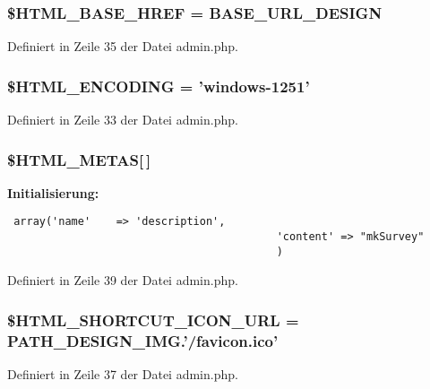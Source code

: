 \subsubsection{\setlength{\rightskip}{0pt plus 5cm}\$HTML\_\-BASE\_\-HREF = {\bf BASE\_\-URL\_\-DESIGN}}\label{admin_8php_bdd3b27cd848a5c3c8bc46b030a87eb3}




Definiert in Zeile 35 der Datei admin.php.
\subsubsection{\setlength{\rightskip}{0pt plus 5cm}\$HTML\_\-ENCODING = 'windows-1251'}\label{admin_8php_d7fdb84ca914d8fc89cc328e4c09c70c}




Definiert in Zeile 33 der Datei admin.php.
\subsubsection{\setlength{\rightskip}{0pt plus 5cm}\$HTML\_\-METAS[$\,$]}\label{admin_8php_5431d1deb1660c35c5a33d6787163104}


\textbf{Initialisierung:}

\begin{Code}\begin{verbatim} array('name'    => 'description',
                                          'content' => "mkSurvey"
                                          )
\end{verbatim}
\end{Code}


Definiert in Zeile 39 der Datei admin.php.
\subsubsection{\setlength{\rightskip}{0pt plus 5cm}\$HTML\_\-SHORTCUT\_\-ICON\_\-URL = PATH\_\-DESIGN\_\-IMG.'/favicon.ico'}\label{admin_8php_3b303c22384e5d686c1f3a8ab1ec5f24}




Definiert in Zeile 37 der Datei admin.php.
